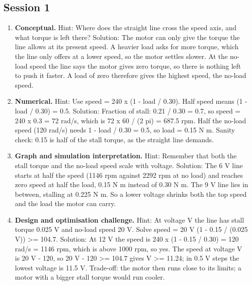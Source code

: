 \documentclass[11pt,a4paper]{article}
\begin{document}
\subsection*{Session 1}
\begin{enumerate}[nosep]
\item \textbf{Conceptual.} Hint: Where does the straight line cross the speed axis, and what torque is left there? Solution: The motor can only give the torque the line allows at its present speed. A heavier load asks for more torque, which the line only offers at a lower speed, so the motor settles slower. At the no-load speed the line says the motor gives zero torque, so there is nothing left to push it faster. A load of zero therefore gives the highest speed, the no-load speed.
\item \textbf{Numerical.} Hint: Use speed = 240 x (1 - load / 0.30). Half speed means (1 - load / 0.30) = 0.5. Solution: Fraction of stall: 0.21 / 0.30 = 0.7, so speed = 240 x 0.3 = 72 rad/s, which is 72 x 60 / (2 pi) = 687.5 rpm. Half the no-load speed (120 rad/s) needs 1 - load / 0.30 = 0.5, so load = 0.15 N m. Sanity check: 0.15 is half of the stall torque, as the straight line demands.
\item \textbf{Graph and simulation interpretation.} Hint: Remember that both the stall torque and the no-load speed scale with voltage. Solution: The 6 V line starts at half the speed (1146 rpm against 2292 rpm at no load) and reaches zero speed at half the load, 0.15 N m instead of 0.30 N m. The 9 V line lies in between, stalling at 0.225 N m. So a lower voltage shrinks both the top speed and the load the motor can carry.
\item \textbf{Design and optimisation challenge.} Hint: At voltage V the line has stall torque 0.025 V and no-load speed 20 V. Solve speed = 20 V (1 - 0.15 / (0.025 V)) \textgreater{}= 104.7. Solution: At 12 V the speed is 240 x (1 - 0.15 / 0.30) = 120 rad/s = 1146 rpm, which is above 1000 rpm, so yes. The speed at voltage V is 20 V - 120, so 20 V - 120 \textgreater{}= 104.7 gives V \textgreater{}= 11.24; in 0.5 V steps the lowest voltage is 11.5 V. Trade-off: the motor then runs close to its limits; a motor with a bigger stall torque would run cooler.
\end{enumerate}
\end{document}
